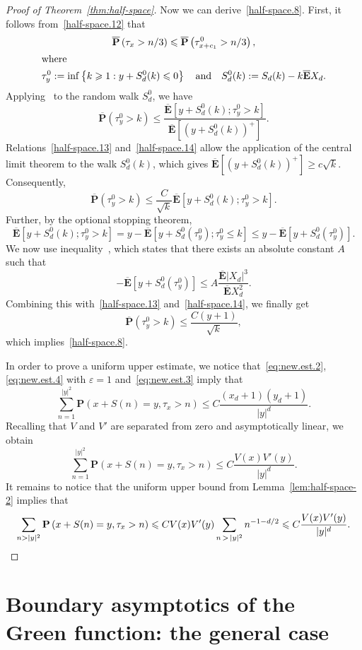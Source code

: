\documentclass[10pt]{amsart}
\theoremstyle{definition}\newtheorem{defi}[theo]{Definition}\newtheorem{rema}[theo]{Remark}\newtheorem{exam}[theo]{Example}\newtheorem{exem}[theo]{Example}\newtheorem{nota}[theo]{Notation}
\newcommand{\pr}{\mathbf{P}}
\newcommand{\e}{\mathbf{E}}
\renewcommand{\le}{\leqslant}
\renewcommand{\ge}{\geqslant}
\begin{document}
\begin{proof}[Proof of Theorem~\ref{thm:half-space}]
Now we can derive~\eqref{half-space.8}. First, it follows from~\eqref{half-space.12} that
\begin{gather*}
\overline{\pr}\left(\tau_x>n/3\right)\le \overline{\pr}\left(\tau^0_{x+c_1}>n/3\right),
\\
\intertext{where}
\tau_y^0:=\inf\left\{k\ge1:y+S_d^0(k)\le0\right\}\quad\text{and}\quad S_d^0(k):=S_d(k)-k\overline{\e}X_d.
\end{gather*}
Applying~\cite[Lemma~25]{DeSaWa-18} to the random walk $S_d^0$, we have
\[
\overline{\pr}\left(\tau^0_y>k\right)
\le\frac{\overline{\e}\left[y+S_d^0(k);\tau_y^0>k\right]}{\overline{\e}\left[\left(y+S_d^0(k)\right)^+\right]}.
\]
Relations~\eqref{half-space.13} and~\eqref{half-space.14} allow the application of the central limit theorem to the walk $S_d^0(k)$, which gives $\overline{\e}[(y+S_d^0(k))^+]\ge c\sqrt{k}$. Consequently,
\[
\overline{\pr}\left(\tau^0_y>k\right)\le\frac{C}{\sqrt{k}}\overline{\e}\left[y+S_d^0(k);\tau_y^0>k\right].
\]
Further, by the optional stopping theorem,
\[
\overline{\e}\left[y+S_d^0(k);\tau_y^0>k\right]=y-\overline{\e}\left[y+S_d^0\left(\tau_y^0\right);\tau_y^0\le k\right]
\le y-\overline{\e}\left[y+S_d^0\left(\tau_y^0\right)\right].
\]
We now use inequality~\cite[Equation~(7)]{Mo-73}, which states that there exists an absolute constant $A$ such that
\[
-\overline{\e}\left[y+S_d^0\left(\tau_y^0\right)\right]
\le A\frac{\overline{\e}|X_d|^3}{\overline{\e}X_d^2}.
\]
Combining this with~\eqref{half-space.13} and~\eqref{half-space.14}, we finally get
\[
\overline{\pr}\left(\tau^0_y>k\right)\le \frac{C(y+1)}{\sqrt{k}},
\]
which implies~\eqref{half-space.8}.

In order to prove a uniform upper estimate, we notice that~\eqref{eq:new.est.2}, \eqref{eq:new.est.4} with $\varepsilon=1$ and~\eqref{eq:new.est.3} imply that
\[
\sum_{n=1}^{|y|^2}\pr\left(x+S(n)=y,\tau_x>n\right)
\le C\frac{(x_d+1)(y_d+1)}{|y|^d}.
\]
Recalling that $V$ and $V'$ are separated from zero and asymptotically linear, we obtain
\[
\sum_{n=1}^{|y|^2}\pr\left(x+S(n)=y,\tau_x>n\right)
\le C\frac{V(x)V'(y)}{|y|^d}.
\]
It remains to notice that the uniform upper bound from Lemma~\ref{lem:half-space-2} implies that
\[
\sum_{n>|y|^2}\pr\left(x+S(n)=y,\tau_x>n\right)
\le CV(x)V'(y)\sum_{n\,>\,|y|^2} n^{-1-d/2}
\le C\frac{V(x)V'(y)}{|y|^d}.\qedhere
\]
\end{proof}

\section{Boundary asymptotics of the Green function: the general case}\label{sec:boundary}
\end{document}
